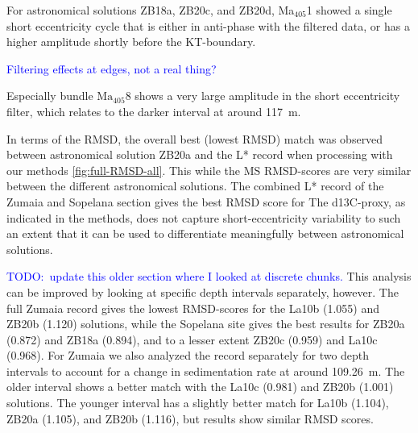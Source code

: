 \documentclass[draft]{agujournal2019}
\newcommand{\ijk}{\textcolor{blue}}
\begin{document}
For astronomical solutions ZB18a, ZB20c, and ZB20d, Ma\(_{405}\)1 showed a single short eccentricity cycle that is either in anti-phase with the filtered data, or has a higher amplitude shortly before the \gls{KT}-boundary.

\ijk{Filtering effects at edges, not a real thing?}


Especially bundle \(\text{Ma}_{405}8\) shows a very large amplitude in the short eccentricity filter, which relates to the darker interval at around \qty{117}{\metre}.


In terms of the \gls{RMSD}, the overall best (lowest \gls{RMSD}) match was observed between astronomical solution ZB20a and the \gls{L*} record when processing with our methods \cref{fig:full-RMSD-all}.
This while the \gls{MS}
\gls{RMSD}-scores are very similar between the different astronomical solutions.
The combined \gls{L*} record of the Zumaia and Sopelana section gives the best \gls{RMSD} score for
The \gls{d13C}-proxy, as indicated in the methods, does not capture short-eccentricity variability to such an extent that it can be used to differentiate meaningfully between astronomical solutions.

\ijk{TODO:\ update this older section where I looked at discrete chunks.}
This analysis can be improved by looking at specific depth intervals separately, however.
The full Zumaia record gives the lowest \gls{RMSD}-scores for the La10b (\num{1.055}) and ZB20b (\num{1.120}) solutions,
while the Sopelana site gives the best results for ZB20a (\num{0.872}) and ZB18a (\num{0.894}), and to a lesser extent ZB20c (\num{0.959}) and La10c (\num{0.968}).
For Zumaia we also analyzed the record separately for two depth intervals to account for a change in sedimentation rate at around \qty{109.26}{\metre}.
The older interval shows a better match with the La10c (\num{0.981}) and ZB20b (1.001) solutions.
The younger interval has a slightly better match for La10b (\num{1.104}), ZB20a (\num{1.105}), and ZB20b (\num{1.116}), but results show similar \gls{RMSD} scores.
\end{document}
